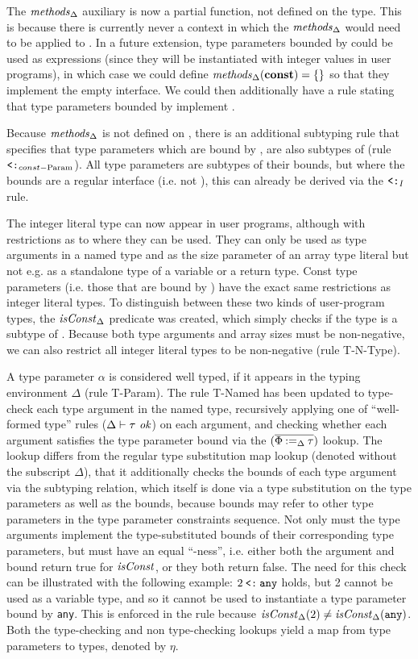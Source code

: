 The $\mathit{methods}_\Delta$ auxiliary is now a partial function, not defined on the
 type. This is because there is currently never a context in which the
$\mathit{methods}_\Delta$ would need to be applied to . In a future extension,
type parameters bounded by  could be used as expressions (since they will
be instantiated with integer values in user programs), in which case we could
define $\mathit{methods}_\Delta(\texttt{\bf const}) = \{\}$ so that they implement the empty
interface. We could then additionally have a rule stating that type parameters
bounded by  implement .

Because $\mathit{methods}_\Delta$ is not defined on , there is an additional
subtyping rule that specifies that type parameters which are bound by
, are also subtypes of  (rule $\mathbin{\texttt{<:}}_{const-\text{Param}}$).
All type parameters are subtypes of their bounds, but where the bounds are a
regular interface (i.e. not ), this can already be derived via the
$\mathbin{\texttt{<:}}_I$ rule.

The integer literal type can now appear in user programs, although with
restrictions as to where they can be used. They can only be used as type
arguments in a named type and as the size parameter of an array type literal but
not e.g. as a standalone type of a variable or a return type. Const type
parameters (i.e. those that are bound by ) have the exact same
restrictions as integer literal types. To distinguish between these two kinds of
user-program types, the $\mathit{isConst}_\Delta$ predicate was created, which simply
checks if the type is a subtype of . Because both  type
arguments and array sizes must be non-negative, we can also restrict all integer
literal types to be non-negative (rule T-N-Type).

A type parameter $\alpha$ is considered well typed, if it appears in the typing
environment $\Delta$ (rule T-Param). The rule T-Named has been updated to
type-check each type argument in the named type, recursively applying one of
``well-formed type'' rules ($\Delta \vdash \tau ~\mathit{ok}$) on each argument, and
checking whether each argument satisfies the type parameter bound via the
$(\overline{\Phi \mathbin{:=}_\Delta \tau})$ lookup. The lookup differs from the regular type
substitution map lookup (denoted without the subscript $\Delta$), that it
additionally checks the bounds of each type argument via the subtyping relation,
which itself is done via a type substitution on the type parameters as well as
the bounds, because bounds may refer to other type parameters in the type
parameter constraints sequence. Not only must the type arguments implement the
type-substituted bounds of their corresponding type parameters, but must have an
equal ``-ness'', i.e. either both the argument and bound return true
for $\mathit{isConst}$, or they both return false. The need for this check can be
illustrated with the following example: $2 \mathbin{\texttt{<:}} \texttt{any}$ holds, but 2
cannot be used as a variable type, and so it cannot be used to instantiate a
type parameter bound by \texttt{any}. This is enforced in the rule because
$\mathit{isConst}_\Delta(2) \neq \mathit{isConst}_\Delta(\texttt{any})$. Both the type-checking
and non type-checking lookups yield a map from type parameters to types, denoted
by $\eta$.



